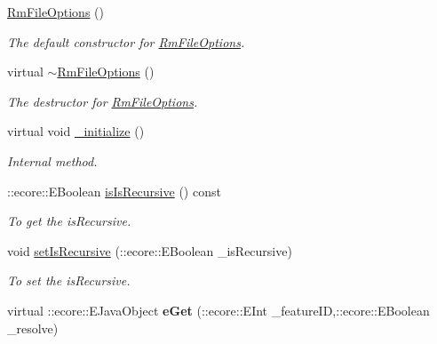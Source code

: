 \begin{DoxyCompactItemize}
\item 
\hypertarget{classFMS__Data_1_1RmFileOptions_a703ae6f628a4eda172a6fbd73142c562}{
\hyperlink{classFMS__Data_1_1RmFileOptions_a703ae6f628a4eda172a6fbd73142c562}{RmFileOptions} ()}
\label{classFMS__Data_1_1RmFileOptions_a703ae6f628a4eda172a6fbd73142c562}

\begin{DoxyCompactList}\small\item\em The default constructor for \hyperlink{classFMS__Data_1_1RmFileOptions}{RmFileOptions}. \item\end{DoxyCompactList}\item 
\hypertarget{classFMS__Data_1_1RmFileOptions_a0303852b2ae07ebe64c60d65699c4110}{
virtual \hyperlink{classFMS__Data_1_1RmFileOptions_a0303852b2ae07ebe64c60d65699c4110}{$\sim$RmFileOptions} ()}
\label{classFMS__Data_1_1RmFileOptions_a0303852b2ae07ebe64c60d65699c4110}

\begin{DoxyCompactList}\small\item\em The destructor for \hyperlink{classFMS__Data_1_1RmFileOptions}{RmFileOptions}. \item\end{DoxyCompactList}\item 
\hypertarget{classFMS__Data_1_1RmFileOptions_a46f676775b24aacb8c858946b8318ba7}{
virtual void \hyperlink{classFMS__Data_1_1RmFileOptions_a46f676775b24aacb8c858946b8318ba7}{\_\-initialize} ()}
\label{classFMS__Data_1_1RmFileOptions_a46f676775b24aacb8c858946b8318ba7}

\begin{DoxyCompactList}\small\item\em Internal method. \item\end{DoxyCompactList}\item 
::ecore::EBoolean \hyperlink{classFMS__Data_1_1RmFileOptions_aa8dd29dfd06431287c18669e789e8ebb}{isIsRecursive} () const 
\begin{DoxyCompactList}\small\item\em To get the isRecursive. \item\end{DoxyCompactList}\item 
void \hyperlink{classFMS__Data_1_1RmFileOptions_a20a7cbb6bfc1a9b501017d83b482a57e}{setIsRecursive} (::ecore::EBoolean \_\-isRecursive)
\begin{DoxyCompactList}\small\item\em To set the isRecursive. \item\end{DoxyCompactList}\item 
\hypertarget{classFMS__Data_1_1RmFileOptions_a3c38ff352ce982cf1141af527a00364b}{
virtual ::ecore::EJavaObject {\bfseries eGet} (::ecore::EInt \_\-featureID,::ecore::EBoolean \_\-resolve)}
\label{classFMS__Data_1_1RmFileOptions_a3c38ff352ce982cf1141af527a00364b}


\end{DoxyCompactItemize}
